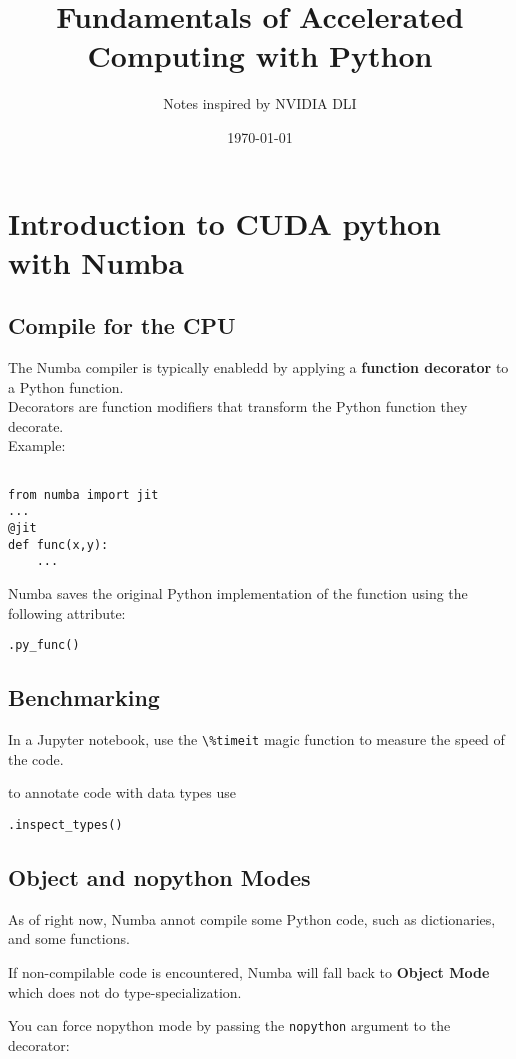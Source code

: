 \documentclass{article}
\title{Fundamentals of Accelerated Computing with Python}
\author{Notes inspired by NVIDIA DLI}
\date{\today}
\begin{document}
\maketitle

\section{Introduction to CUDA python with Numba}
\subsection{Compile for the CPU}
The Numba compiler is typically enabledd by applying a \textbf{function decorator} to a Python function. \\

Decorators are function modifiers that transform the Python function they decorate. \\
Example: 

\begin{verbatim}

from numba import jit
...
@jit
def func(x,y):
	...
\end{verbatim}

Numba saves the original Python implementation of the function using the following attribute:

\begin{verbatim}
.py_func()
\end{verbatim}

\subsection{Benchmarking}
In a Jupyter notebook, use the \verb_\%timeit_ magic function to measure the speed of the code.

to annotate code with data types use

\begin{verbatim}
.inspect_types()
\end{verbatim}

\subsection{Object and nopython Modes}
As of right now, Numba annot compile some Python code, such as dictionaries, and some functions.

If non-compilable code is encountered, Numba will fall back to \textbf{Object Mode} which does not do type-specialization.

You can force nopython mode by passing the \verb_nopython_ argument to the decorator:
\end{document}
